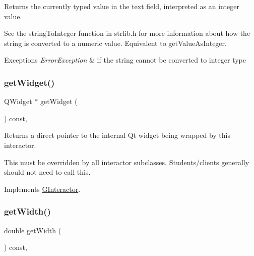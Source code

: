 Returns the currently typed value in the text field, interpreted as an integer value. 

See the string\+To\+Integer function in strlib.\+h for more information about how the string is converted to a numeric value. Equivalent to get\+Value\+As\+Integer. 
\begin{DoxyExceptions}{Exceptions}
{\em Error\+Exception} & if the string cannot be converted to integer type \\
\hline
\end{DoxyExceptions}
\mbox{\label{classGTextField_a3b33a602b31a6b809d020535a59db3b4}} 
\subsubsection{\texorpdfstring{get\+Widget()}{getWidget()}}
{\footnotesize\ttfamily Q\+Widget $\ast$ get\+Widget (\begin{DoxyParamCaption}{ }\end{DoxyParamCaption}) const\hspace{0.3cm}{\ttfamily [override]}, {\ttfamily [virtual]}}



Returns a direct pointer to the internal Qt widget being wrapped by this interactor. 

This must be overridden by all interactor subclasses. Students/clients generally should not need to call this. 

Implements \mbox{\hyperlink{classGInteractor}{G\+Interactor}}.

\mbox{\label{classGInteractor_a0ed2965abd4f5701d2cadf71239faf19}} 
\subsubsection{\texorpdfstring{get\+Width()}{getWidth()}}
{\footnotesize\ttfamily double get\+Width (\begin{DoxyParamCaption}{ }\end{DoxyParamCaption}) const\hspace{0.3cm}{\ttfamily [virtual]}, {\ttfamily [inherited]}}



